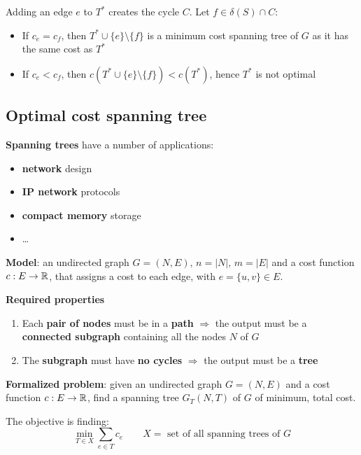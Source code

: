 \documentclass[english]{article}
\begin{document}
Adding an edge \(e\) to \(T^\ast\) creates the cycle \(C\).
Let \(f \in \delta(S) \cap C\):

\begin{itemize}
  \item If \(c_e = c_f\), then \(T^\ast \cup \{e\}\setminus \{f\}\) is a minimum cost spanning tree of \(G\) as it has the same cost as \(T^\ast\)
  \item If \(c_e < c_f\), then \(c \left( T^\ast \cup \{e\} \setminus \{f\} \right) < c \left(T^\ast\right)\), hence \(T^\ast\) is not optimal
\end{itemize}

\subsection{Optimal cost spanning tree}

\textbf{Spanning trees} have a number of applications:

\begin{itemize}
  \item \textbf{network} design
  \item \textbf{IP network} protocols
  \item \textbf{compact memory} storage
  \item \ldots
\end{itemize}

\bigskip
\textbf{Model}:
an undirected graph \(G = (N, E), \, n = |N|, \, m = |E|\) and a cost function \(c: E \rightarrow \mathbb{R}\), that assigns a cost to each edge, with \(e = \{u, v\} \in E\).

\bigskip
\textbf{Required properties}
\begin{enumerate}
  \item Each \textbf{pair of nodes} must be in a \textbf{path} \(\Rightarrow\) the output must be a \textbf{connected subgraph} containing all the nodes \(N\) of \(G\)
  \item The \textbf{subgraph} must have \textbf{no cycles} \(\Rightarrow\) the output must be a \textbf{tree}
\end{enumerate}

\bigskip
\textbf{Formalized problem}:
given an undirected graph \(G = (N, E)\) and a cost function \(c: E \rightarrow \mathbb{R}\), find a spanning tree \(G_T(N, T)\) of \(G\) of minimum, total cost.

The objective is finding:
\[ \displaystyle \min_{T \in X} \sum_{e \in T} c_e \qquad X = \text{ set of all spanning trees of } G \]
\end{document}

